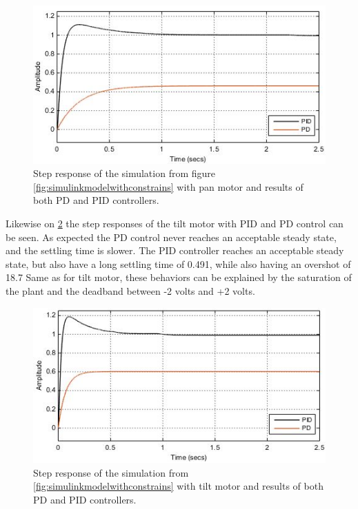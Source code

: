 \begin{figure}[h!]
\centering
\includegraphics[scale=0.7]{Billeder/SimuStepPanPDAndPID.jpg}
\caption{ Step response of the simulation from figure \ref{fig:simulinkmodelwithconstrains} with pan motor and results of both PD and PID controllers.
 }
\label{fig:SimuStepTiltPDAndPID}
\end{figure}

Likewise on \ref{fig:SimuStepTiltPDAndPID} the step responses of the tilt motor with PID and PD control can be seen. As expected the PD control never reaches an acceptable steady state, and the settling time is slower. The PID controller reaches an acceptable steady state, but also have a long settling time of 0.491, while also having an overshot of 18.7%
Same as for tilt motor, these behaviors can be explained by the saturation of the plant and the deadband between -2 volts and +2 volts.


\begin{figure}[h!]
\centering
\includegraphics[scale=0.7]{Billeder/SimuStepTiltPDAndPID.jpg}
\caption{  Step response of the simulation from \ref{fig:simulinkmodelwithconstrains} with tilt motor and results of both PD and PID controllers.
 }
\label{fig:SimuStepTiltPDAndPID}
\end{figure}


